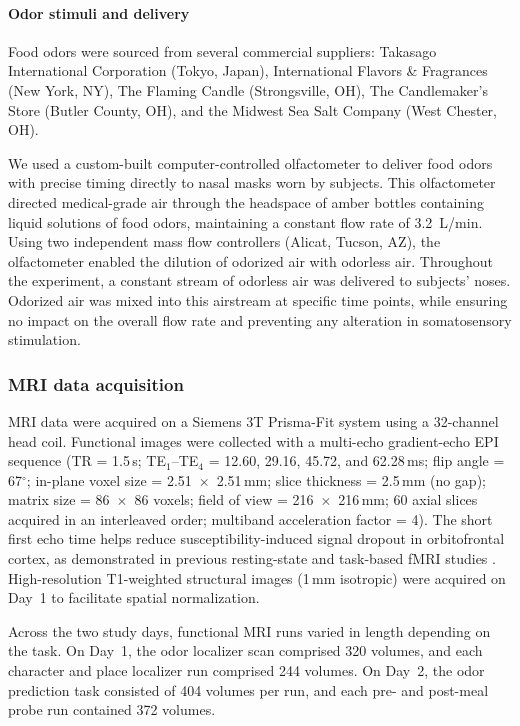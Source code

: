 \documentclass[9pt,twoside,lineno]{pnas-new}
\begin{document}
\paragraph*{Odor stimuli and delivery}

Food odors were sourced from several commercial suppliers: Takasago International Corporation (Tokyo, Japan), International Flavors \& Fragrances (New York, NY), The Flaming Candle (Strongsville, OH), The Candlemaker’s Store (Butler County, OH), and the Midwest Sea Salt Company (West Chester, OH).

We used a custom-built computer-controlled olfactometer to deliver food odors with precise timing directly to nasal masks worn by subjects. This olfactometer directed medical-grade air through the headspace of amber bottles containing liquid solutions of food odors, maintaining a constant flow rate of 3.2~L/min. Using two independent mass flow controllers (Alicat, Tucson, AZ), the olfactometer enabled the dilution of odorized air with odorless air. Throughout the experiment, a constant stream of odorless air was delivered to subjects’ noses. Odorized air was mixed into this airstream at specific time points, while ensuring no impact on the overall flow rate and preventing any alteration in somatosensory stimulation.

\subsubsection*{MRI data acquisition}

MRI data were acquired on a Siemens 3T Prisma-Fit system using a 32-channel head coil. Functional images were collected with a multi-echo gradient-echo EPI sequence (TR = 1.5\,s; TE$_1$--TE$_4$ = 12.60, 29.16, 45.72, and 62.28\,ms; flip angle = 67$^\circ$; in-plane voxel size = 2.51~$\times$~2.51\,mm; slice thickness = 2.5\,mm (no gap); matrix size = 86~$\times$~86 voxels; field of view = 216~$\times$~216\,mm; 60 axial slices acquired in an interleaved order; multiband acceleration factor = 4). The short first echo time helps reduce susceptibility-induced signal dropout in orbitofrontal cortex, as demonstrated in previous resting-state and task-based fMRI studies \cite{RN619,RN524,kirlutpos16,zhao24img}. High-resolution T1-weighted structural images (1\,mm isotropic) were acquired on Day~1 to facilitate spatial normalization.

Across the two study days, functional MRI runs varied in length depending on the task. On Day~1, the odor localizer scan comprised 320 volumes, and each character and place localizer run comprised 244 volumes. On Day~2, the odor prediction task consisted of 404 volumes per run, and each pre- and post-meal probe run contained 372 volumes.
\end{document}
